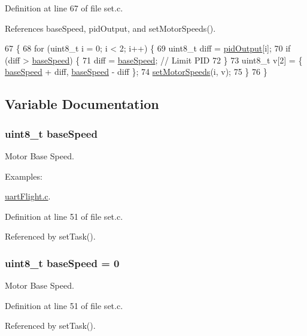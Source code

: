 Definition at line 67 of file set.\-c.



References base\-Speed, pid\-Output, and set\-Motor\-Speeds().


\begin{DoxyCode}
67                    \{
68     \textcolor{keywordflow}{for} (uint8\_t i = 0; i < 2; i++) \{
69         uint8\_t diff = \hyperlink{group__pid_ga5b70790e470e0c5812d24a8a098c01e0}{pidOutput}[i];
70         \textcolor{keywordflow}{if} (diff > \hyperlink{group__set_gab2b0c78a81e045d7a8f28be307b8c61b}{baseSpeed}) \{
71             diff = \hyperlink{group__set_gab2b0c78a81e045d7a8f28be307b8c61b}{baseSpeed}; \textcolor{comment}{// Limit PID}
72         \}
73         uint8\_t v[2] = \{ \hyperlink{group__set_gab2b0c78a81e045d7a8f28be307b8c61b}{baseSpeed} + diff, \hyperlink{group__set_gab2b0c78a81e045d7a8f28be307b8c61b}{baseSpeed} - diff \};
74         \hyperlink{group__set_ga4173baf06c19647e0c60ef2e910bbc87}{setMotorSpeeds}(i, v);
75     \}
76 \}
\end{DoxyCode}


\subsection{Variable Documentation}
\hypertarget{group__set_gab2b0c78a81e045d7a8f28be307b8c61b}{
\subsubsection[{base\-Speed}]{\setlength{\rightskip}{0pt plus 5cm}uint8\-\_\-t base\-Speed}}\label{group__set_gab2b0c78a81e045d7a8f28be307b8c61b}


Motor Base Speed. 

\begin{Desc}
\item[Examples\-: ]\par
\hyperlink{uart_flight_8c-example}{uart\-Flight.\-c}.\end{Desc}


Definition at line 51 of file set.\-c.



Referenced by set\-Task().

\hypertarget{group__set_gab2b0c78a81e045d7a8f28be307b8c61b}{
\subsubsection[{base\-Speed}]{\setlength{\rightskip}{0pt plus 5cm}uint8\-\_\-t base\-Speed = 0}}\label{group__set_gab2b0c78a81e045d7a8f28be307b8c61b}


Motor Base Speed. 



Definition at line 51 of file set.\-c.



Referenced by set\-Task().

